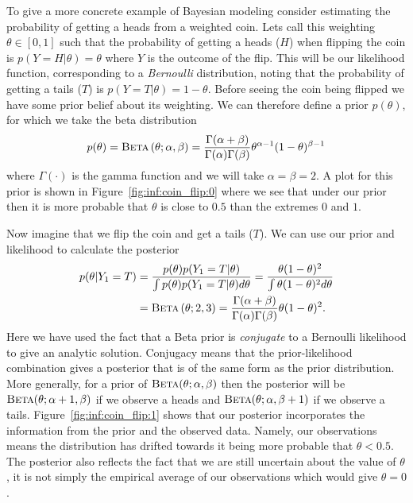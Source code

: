 To give a more concrete example of Bayesian modeling consider estimating
the probability of getting a heads from a weighted coin.  Lets call this weighting $\theta \in [0,1]$ such
that the probability of getting a heads  ($H$)  when flipping the coin is $p(Y=H | \theta)=\theta$
where $Y$ is the outcome of the flip.  This will be our likelihood function, corresponding to a
\emph{Bernoulli} distribution, noting that the probability
of getting a tails ($T$) is $p(Y = T | \theta) = 1-\theta$.
Before seeing the coin being flipped we have some prior belief about its weighting.  We
can therefore define a prior $p(\theta)$, for which we take the beta distribution
\begin{align}
\label{eq:bayes:beta}
p(\theta) = \textsc{Beta}\left(\theta ; \alpha,\beta\right) = \frac{\Gamma(\alpha+\beta)}{\Gamma (\alpha) \Gamma(\beta)}
\theta^{\alpha-1} (1-\theta)^{\beta-1}
\end{align}
where $\Gamma(\cdot)$ is the gamma function and we will take $\alpha=\beta=2$.  
A plot for this prior is shown in Figure~\ref{fig:inf:coin_flip:0}
where we see that under our prior then it is more probable that $\theta$ is close to $0.5$ than the
extremes $0$ and $1$.  

Now imagine that we flip the coin and get a tails ($T$).  We can
use our prior and likelihood to calculate the posterior
\begin{align}
p(\theta | Y_1 = T) &= \frac{p(\theta) p(Y_1=T | \theta)}{\int p(\theta) p(Y_1=T | \theta) d\theta} = \frac{\theta (1-\theta)^2}{\int \theta (1-\theta)^2 d\theta} \nonumber \\
&= \textsc{Beta}\left(\theta ; 2,3\right) = 
\frac{\Gamma(\alpha+\beta)}{\Gamma (\alpha) \Gamma(\beta)} \theta (1-\theta)^2 \label{eq:prob:beta_post_1}.
\end{align}
Here we have used the fact that a Beta prior is \emph{conjugate} to a Bernoulli likelihood
to give an analytic solution.  Conjugacy means that the prior-likelihood combination gives
a posterior that is of the same form as the prior distribution.  More generally, for a prior of
$\textsc{Beta}(\theta ; \alpha, \beta)$ then the posterior will be $\textsc{Beta}(\theta ; \alpha+1, \beta)$
if we observe a heads and $\textsc{Beta}(\theta ; \alpha, \beta+1)$ if we observe a tails.
Figure~\ref{fig:inf:coin_flip:1} shows that our
posterior incorporates the information from the prior and the observed data.  Namely, our observations 
means the distribution
has drifted towards it being more probable that $\theta<0.5$.  The posterior
also reflects the fact that we are still uncertain about the value of $\theta$, it is not simply the
empirical average of our observations which would give $\theta=0$.

